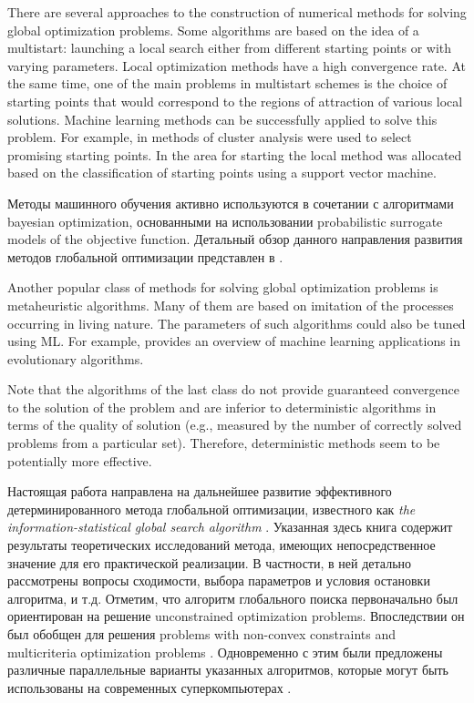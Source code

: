 \documentclass[entropy,article,submit,moreauthors,pdftex]{Definitions/mdpi}
\begin{document}
There are several approaches to the construction of numerical methods for solving global optimization problems. 
Some algorithms are based on the idea of a multistart: launching a local search either from different starting points or with varying parameters. Local optimization methods have a high convergence rate. At the same time, one of the main problems in multistart schemes is the choice of starting points that would correspond to the regions of attraction of various local solutions. 
Machine learning methods can be successfully applied to solve this problem.  
For example, in \cite{RinnooyKan1987} methods of cluster analysis were used to select promising starting points.
In \cite{Cassioli2012} the area for starting the local method was allocated based on the classification of starting points using a support vector machine.

Методы машинного обучения активно используются в сочетании с алгоритмами bayesian optimization, основанными на использовании probabilistic surrogate models of the objective function. Детальный обзор данного направления развития методов глобальной оптимизации представлен в \cite{Archetti2019,Zhigljavsky2021}.

Another popular class of methods for solving global optimization problems is metaheuristic algorithms. 
Many of them are based on imitation of the processes occurring in living nature. The parameters of such algorithms could also be tuned using ML. For example, \cite{Jin2005} provides an overview of machine learning applications in evolutionary algorithms.

Note that the algorithms of the last class do not provide guaranteed convergence to the solution of the problem and are inferior to deterministic algorithms in terms of the quality of solution \cite{Kvasov2018,Sergeyev2018} (e.g., measured by the number of correctly solved problems from a particular set). Therefore, deterministic methods seem to be potentially more effective.

Настоящая работа направлена на дальнейшее развитие эффективного детерминированного метода глобальной оптимизации, известного как \textit{the information-statistical global search algorithm} \cite{Strongin2000}. Указанная здесь книга содержит результаты теоретических исследований метода, имеющих непосредственное значение для его практической реализации. В частности, в ней детально рассмотрены вопросы сходимости, выбора параметров и условия остановки алгоритма, и т.д.
Отметим, что алгоритм глобального поиска первоначально был ориентирован на решение unconstrained optimization problems. Впоследствии он был обобщен для решения problems with non-convex constraints\cite{Barkalov2002} and multicriteria optimization problems \cite{Gergel2020}.
Одновременно с этим были предложены различные параллельные варианты указанных алгоритмов, которые могут быть использованы на современных суперкомпьютерах \cite{Barkalov2016,globalizerSystem,Strongin2018}.
\end{document}
